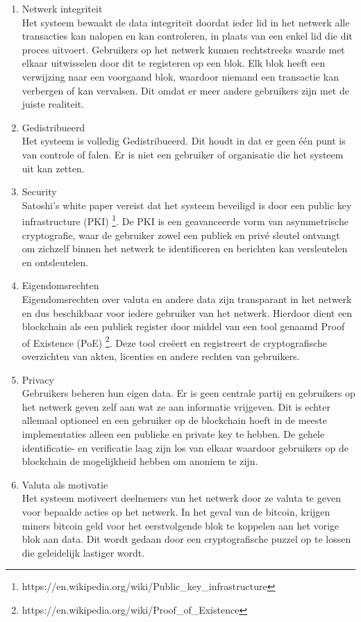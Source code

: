 \begin{enumerate}
	\item Netwerk integriteit\\
	Het systeem bewaakt de data integriteit doordat ieder lid in het netwerk alle transacties kan nalopen en kan controleren, in plaats van een enkel lid die dit proces uitvoert. Gebruikers op het netwerk kunnen rechtstreeks waarde met elkaar uitwisselen door dit te registeren op een blok. Elk blok heeft een verwijzing naar een voorgaand blok, waardoor niemand een transactie kan verbergen of kan vervalsen. Dit omdat er meer andere gebruikers zijn met de juiste realiteit.
	\item Gedistribueerd\\
	Het systeem is volledig Gedistribueerd. Dit houdt in dat er geen één punt is van controle of falen. Er is niet een gebruiker of organisatie die het systeem uit kan zetten.
	\item Security\\
	Satoshi’s white paper \cite{bitcoinPaper} vereist dat het systeem beveiligd is door een public key infrastructure (PKI) \footnote{https://en.wikipedia.org/wiki/Public\_key\_infrastructure}. De PKI is een geavanceerde vorm van asymmetrische cryptografie, waar de gebruiker zowel een publiek en privé sleutel ontvangt om zichzelf binnen het netwerk te identificeren en berichten kan versleutelen en ontsleutelen.
	\item Eigendomsrechten\\
	Eigendomsrechten over valuta en andere data zijn transparant in het netwerk en dus beschikbaar voor iedere gebruiker van het netwerk. Hierdoor dient een blockchain als een publiek register door middel van een tool genaamd Proof of Existence (PoE) \footnote{https://en.wikipedia.org/wiki/Proof\_of\_Existence}. Deze tool creëert en registreert de cryptografische overzichten van akten, licenties en andere rechten van gebruikers.
	\item Privacy\\
	Gebruikers beheren hun eigen data. Er is geen centrale partij en gebruikers op het netwerk geven zelf aan wat ze aan informatie vrijgeven. Dit is echter allemaal optioneel en een gebruiker op de blockchain hoeft in de meeste implementaties alleen een publieke en private key te hebben. De gehele identificatie- en verificatie laag zijn los van elkaar waardoor gebruikers op de blockchain de mogelijkheid hebben om anoniem te zijn.
	\item Valuta als motivatie\\
	Het systeem motiveert deelnemers van het netwerk door ze valuta te geven voor bepaalde acties op het netwerk. In het geval van de bitcoin, krijgen miners bitcoin geld voor het eerstvolgende blok te koppelen aan het vorige blok aan data. Dit wordt gedaan door een cryptografische puzzel op te lossen die geleidelijk lastiger wordt.
\end{enumerate}
\newpage

